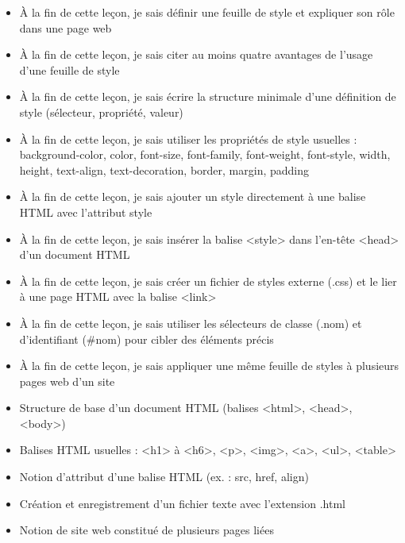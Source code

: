 \documentclass[11pt]{article}
\begin{document}
\begin{objectifs}
\begin{itemize}
\item À la fin de cette leçon, je sais définir une feuille de style et expliquer son rôle dans une page web
\item À la fin de cette leçon, je sais citer au moins quatre avantages de l'usage d'une feuille de style
\item À la fin de cette leçon, je sais écrire la structure minimale d'une définition de style (sélecteur, propriété, valeur)
\item À la fin de cette leçon, je sais utiliser les propriétés de style usuelles : background-color, color, font-size, font-family, font-weight, font-style, width, height, text-align, text-decoration, border, margin, padding
\item À la fin de cette leçon, je sais ajouter un style directement à une balise HTML avec l'attribut style
\item À la fin de cette leçon, je sais insérer la balise <style> dans l'en-tête <head> d'un document HTML
\item À la fin de cette leçon, je sais créer un fichier de styles externe (.css) et le lier à une page HTML avec la balise <link>
\item À la fin de cette leçon, je sais utiliser les sélecteurs de classe (.nom) et d'identifiant (\#nom) pour cibler des éléments précis
\item À la fin de cette leçon, je sais appliquer une même feuille de styles à plusieurs pages web d'un site
\end{itemize}
\end{objectifs}

\begin{prerequis}
\begin{itemize}
\item Structure de base d'un document HTML (balises <html>, <head>, <body>)
\item Balises HTML usuelles : <h1> à <h6>, <p>, <img>, <a>, <ul>, <table>
\item Notion d'attribut d'une balise HTML (ex. : src, href, align)
\item Création et enregistrement d'un fichier texte avec l'extension .html
\item Notion de site web constitué de plusieurs pages liées
\end{itemize}
\end{prerequis}

\newpage
\end{document}
